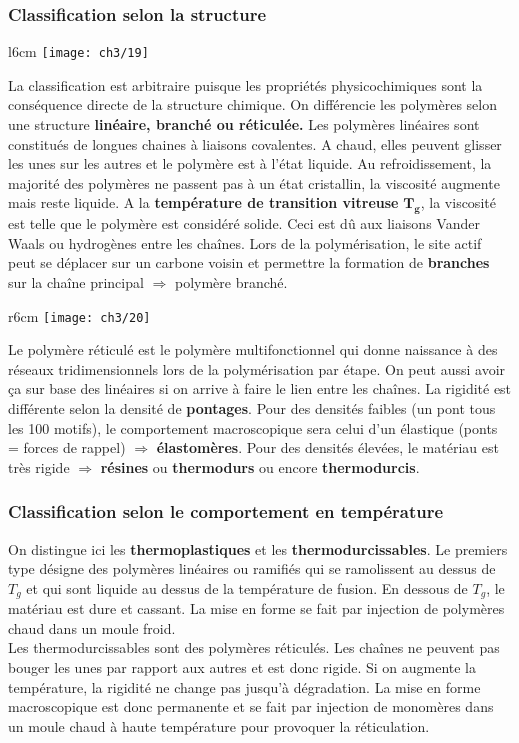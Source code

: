 	\subsubsection{Classification selon la structure}
	\begin{wrapfigure}[8]{l}{6cm}
			\vspace{-5mm}
			\texttt{[image: ch3/19]}
			\end{wrapfigure}	
	La classification est arbitraire puisque les propriétés physicochimiques sont la conséquence directe de la structure chimique. On différencie les polymères selon une structure \textbf{linéaire, branché ou réticulée.} Les polymères linéaires sont constitués de longues chaines à liaisons covalentes. A chaud, elles peuvent glisser les unes sur les autres et le polymère est à l'état liquide. Au refroidissement, la majorité des polymères ne passent pas à un état cristallin, la viscosité augmente mais reste liquide. A la \textbf{température de transition vitreuse} $\mathbf{T_g}$, la viscosité est telle que le polymère est considéré solide. Ceci est dû aux liaisons Vander Waals ou hydrogènes entre les chaînes.
	Lors de la polymérisation, le site actif peut se déplacer sur un carbone voisin et permettre la formation de \textbf{branches} sur la chaîne principal $\Rightarrow$ polymère branché. 
	
	\begin{wrapfigure}[8]{r}{6cm}
			\vspace{-10mm}
			\texttt{[image: ch3/20]}
			\end{wrapfigure}	
			Le polymère réticulé est le polymère multifonctionnel qui donne naissance à des réseaux tridimensionnels lors de la polymérisation par étape. On peut aussi avoir ça sur base des linéaires si on arrive à faire le lien entre les chaînes. La rigidité est différente selon la densité de \textbf{pontages}. Pour des densités faibles (un pont tous les 100 motifs), le comportement macroscopique sera celui d'un élastique (ponts = forces de rappel) $\Rightarrow$ \textbf{élastomères}. Pour des densités élevées, le matériau est très rigide $\Rightarrow$  \textbf{résines} ou \textbf{thermodurs} ou encore \textbf{thermodurcis}. 
	
	\subsubsection{Classification selon le comportement en température}
		On distingue ici les \textbf{thermoplastiques} et les \textbf{thermodurcissables}. Le premiers type désigne des polymères linéaires ou ramifiés qui se ramolissent au dessus de $T_g$ et qui sont liquide au dessus de la température de fusion. En dessous de $T_g$, le matériau est dure et cassant. La mise en forme se fait par injection de polymères chaud dans un moule froid.  \\
		Les thermodurcissables sont des polymères réticulés. Les chaînes ne peuvent pas bouger les unes par rapport aux autres et est donc rigide. Si on augmente la température, la rigidité ne change pas jusqu'à dégradation. La mise en forme macroscopique est donc permanente et se fait par injection de monomères dans un moule chaud à haute température pour provoquer la réticulation. 
		
